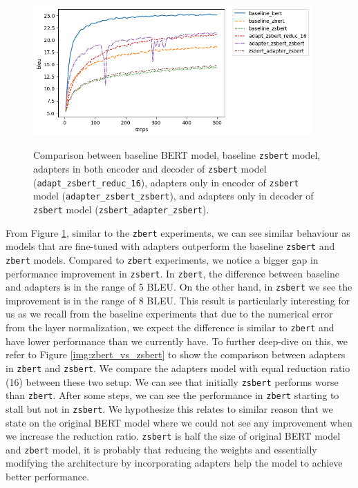 \begin{figure}[h]
    {\includegraphics[width=0.95\textwidth]{img/zsbert_pos.png}}
    \centering
    \caption{Comparison between baseline BERT model, baseline \texttt{zsbert} model, adapters in both encoder and decoder of \texttt{zsbert} model (\texttt{adapt\_zsbert\_reduc\_16}), adapters only in encoder of \texttt{zsbert} model (\texttt{adapter\_zsbert\_zsbert}), and adapters only in decoder of \texttt{zsbert} model (\texttt{zsbert\_adapter\_zsbert}).}
    \label{img:zsbert_pos}
\end{figure}

From Figure \ref{img:zsbert_pos}, similar to the \texttt{zbert} experiments, we can see similar behaviour as models that are fine-tuned with adapters outperform the baseline \texttt{zsbert} and \texttt{zbert} models. Compared to \texttt{zbert} experiments, we notice a bigger gap in performance improvement in \texttt{zsbert}. In \texttt{zbert}, the difference between baseline and adapters is in the range of 5 BLEU. On the other hand, in \texttt{zsbert} we see the improvement is in the range of 8 BLEU. This result is particularly interesting for us as we recall from the baseline experiments that due to the numerical error from the layer normalization, we expect the difference is similar to \texttt{zbert} and have lower performance than we currently have. To further deep-dive on this, we refer to Figure \ref{img:zbert_vs_zsbert} to show the comparison between adapters in \texttt{zbert} and \texttt{zsbert}. We compare the adapters model with equal reduction ratio (16) between these two setup. We can see that initially \texttt{zsbert} performs worse than \texttt{zbert}. After some steps, we can see the performance in \texttt{zbert} starting to stall but not in \texttt{zsbert}. We hypothesize this relates to similar reason that we state on the original BERT model where we could not see any improvement when we increase the reduction ratio. \texttt{zsbert} is half the size of original BERT model and \texttt{zbert} model, it is probably that reducing the weights and essentially modifying the architecture by incorporating adapters help the model to achieve better performance.

